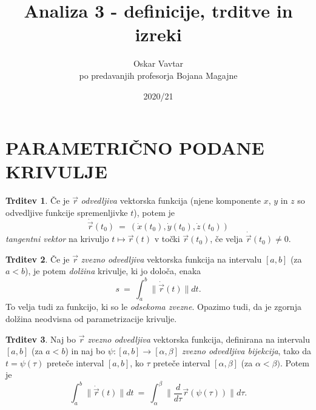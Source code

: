 \documentclass[11pt]{article}
\title{Analiza 3 - definicije, trditve in izreki}
\author{Oskar Vavtar \\
po predavanjih profesorja Bojana Magajne}
\date{2020/21}
\theoremstyle{definition}
\theoremstyle{definition}
\newtheorem{trditev}{Trditev}[section]
\theoremstyle{definition}
\begin{document}
\maketitle
\pagebreak
\tableofcontents
\pagebreak

\section{PARAMETRIČNO PODANE KRIVULJE}
\vspace{0.5cm}	

\begin{trditev}

Če je $\vec{r}$ \textit{odvedljiva} vektorska funkcija (njene komponente $x$, $y$ in $z$ so odvedljive funkcije spremenljivke $t$), potem je
$$\dot{\vec{r}}(t_0) ~=~ (\dot{x}(t_0), \dot{y}(t_0), \dot{z}(t_0))$$
\textit{tangentni vektor} na krivuljo $t \mapsto \vec{r}(t)$ v točki $\vec{r}(t_0)$, če velja $\dot{\vec{r}}(t_0) \neq 0$.
	
\end{trditev}
\vspace{0.5cm}

\begin{trditev}

Če je $\vec{r}$ \textit{zvezno odvedljiva} vektorska funkcija na intervalu $[a, b]$ (za	$a < b$), je potem \textit{dolžina} krivulje, ki jo določa, enaka
$$s ~=~ \int_{a}^{b} \| \dot{\vec{r}}(t) \| dt.$$
To velja tudi za funkcijo, ki so le \textit{odsekoma zvezne}. Opazimo tudi, da je zgornja dolžina neodvisna od parametrizacije krivulje.	

\end{trditev}
\vspace{0.5cm}

\begin{trditev}

Naj bo $\vec{r}$ \textit{zvezno odvedljiva} vektorska funkcija, definirana na intervalu $[a, b]$ (za $a < b$) in naj bo $\psi: [a, b] \rightarrow [\alpha, \beta]$ \textit{zvezno odvedljiva bijekcija}, tako da $t = \psi(\tau)$ preteče interval $[a, b]$, ko $\tau$ preteče interval $[\alpha, \beta]$ (za $\alpha < \beta)$. Potem je
$$\int_{a}^{b} \| \dot{\vec{r}}(t) \| dt ~=~ \int_{\alpha}^{\beta} \| \frac{d}{d \tau} \vec{r}(\psi(\tau)) \| d\tau. $$

\end{trditev}
\vspace{0.5cm}

\end{document}
